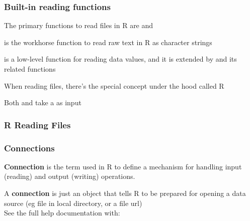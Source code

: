 \documentclass[12pt]{beamer}\usepackage[]{graphicx}\usepackage[]{color}
\begin{document}

\begin{frame}
\frametitle{Built-in reading functions}

\bi
 \item The primary functions to read files in R are {\hilit {}} and {\hilit {}}

 \item {\hilit {}} is the workhorse function to read raw text in R as character strings

 \item {\hilit {}} is a low-level function for reading data values, and it is extended by {\hilit {}} and its related functions

 \item When reading files, there's the special concept under the hood called R {\hilit {}}

 \item Both  and  take a {\hilit {}} as input
\ei

\end{frame}


\begin{frame}
\frametitle{R Reading Files}
\begin{center}
\end{center}
\end{frame}


\begin{frame}
\frametitle{Connections}

\textbf{Connection} is the term used in R to define a mechanism for handling input (reading) and output (writing) operations. 
\eb

A \textbf{connection} is just an object that tells R to be prepared for opening a data source (eg file in local directory, or a file url) \\
See the full help documentation with: {\hilit {}}
\eb

\end{frame}

\end{document}
